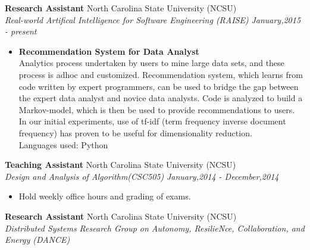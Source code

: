 \documentclass[margin,line]{res}
\begin{document}
\begin{resume}
{\bf Research Assistant} \hfill North Carolina State University (NCSU) \\
\textit{Real-world Artifical Intelligence for Software Engineering (RAISE)} 
\hspace{1cm} \hfill {\it January,2015 - present}
\begin{itemize}
	\item \textbf{Recommendation System for Data Analyst}\\
	Analytics process undertaken by users to mine large data sets, and these process is adhoc and customized. Recommendation system, which learns from code written by expert
	programmers, can be used to bridge the gap between the expert data analyst and novice data analysts. Code is analyzed to build a Markov-model, which is then be used 
	to provide recommendations to users. In our initial experiments, use of tf-idf (term frequency inverse document frequency) has proven to be useful for dimensionality 
	reduction.\\
	Languages used: Python\\
\end{itemize}

{\bf Teaching Assistant} \hfill North Carolina State University (NCSU) \\
\textit{Design and Analysis of Algorithm(CSC505)} \hspace{1cm} \hfill {\it January,2014 - December,2014}
	\begin{itemize}
		\setlength{\itemsep}{-10pt}
		\item Hold weekly office hours and grading of exams.
	\end{itemize}
\newpage
{\bf Research Assistant} \hfill North Carolina State University (NCSU) \\
\textit{Distributed Systems Research Group on Autonomy, ResilieNce, Collaboration, and Energy (DANCE)} 


\end{resume}
\end{document}
